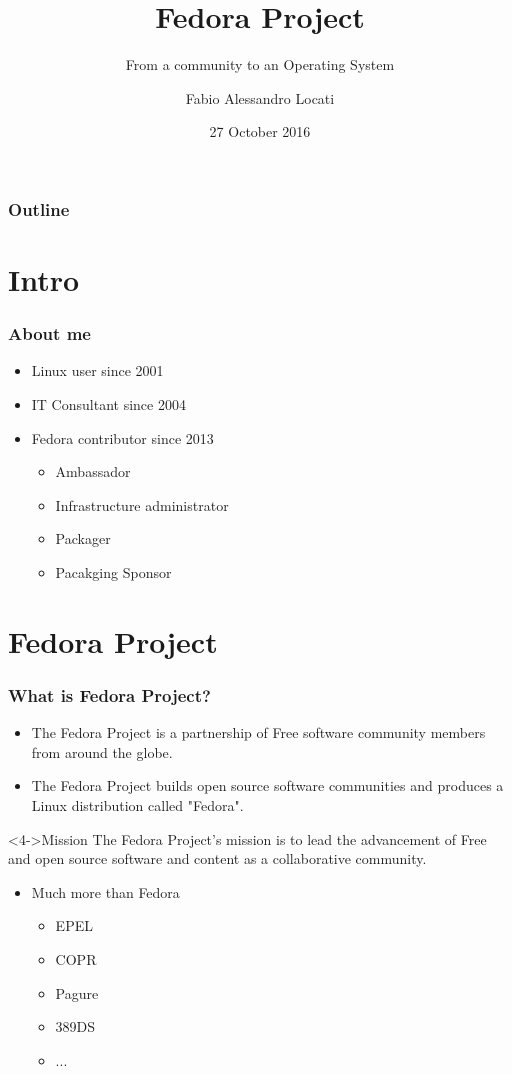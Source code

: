\documentclass[t,aspectratio=169]{beamer}
\title{Fedora Project}
\subtitle{From a community to an Operating System}
\author{Fabio Alessandro Locati}
\date{27 October 2016}
\begin{document}
\maketitle

\begin{frame}
    \frametitle{Outline}
    \tableofcontents
\end{frame}

\section{Intro}
\begin{frame}
    \frametitle{About me} 
    \begin{itemize}
        \item<2-> Linux user since 2001
        \item<3-> IT Consultant since 2004
        \item<4-> Fedora contributor since 2013 
        \begin{itemize}
            \item<5-> Ambassador
            \item<5-> Infrastructure administrator
            \item<5-> Packager
            \item<5-> Pacakging Sponsor
        \end{itemize}
    \end{itemize}
\end{frame}

\section{Fedora Project}
\begin{frame}
    \frametitle{What is Fedora Project?}
    \begin{itemize}
        \item<2-> The Fedora Project is a partnership of Free software community members from around the globe.
        \item<3-> The Fedora Project builds open source software communities and produces a Linux distribution called "Fedora".
    \end{itemize}
    \begin{block}<4->{Mission}
        The Fedora Project's mission is to lead the advancement of Free and open source software and content as a collaborative community.
    \end{block}
    \begin{itemize}
        \item<5-> Much more than Fedora
        \begin{itemize} 
            \item<5-> EPEL 
            \item<5-> COPR
            \item<5-> Pagure
            \item<5-> 389DS
            \item<5-> ...
        \end{itemize}
    \end{itemize}
\end{frame}
\end{document}
